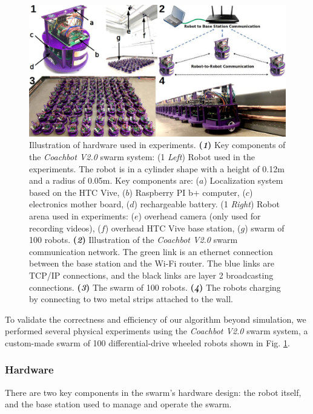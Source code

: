 \documentclass[journal]{IEEEtran}
\begin{document}
\begin{figure}[t]
\centering
\includegraphics[width=1.0\textwidth]{variance/all_v.jpg}
\caption{Illustration of hardware used in experiments. \textbf{(\textit{1})} Key components of the \textit{Coachbot V2.0} swarm system: (1 \textit{Left}) Robot used in the experiments. The robot is in a cylinder shape with a height of 0.12m and a radius of 0.05m.  Key components are: ($a$) Localization system based on the HTC Vive, ($b$) Raspberry PI b+ computer, ($c$) electronics mother board, ($d$) rechargeable battery. (1 \textit{Right}) Robot arena used in experiments: ($e$) overhead camera (only used for recording videos), ($f$) overhead HTC Vive base station, ($g$) swarm of 100 robots. \textbf{(\textit{2})} Illustration of the \textit{Coachbot V2.0} swarm communication network. The green link is an ethernet connection between the base station and the Wi-Fi router.  The blue links are TCP/IP connections, and the black links are layer 2 broadcasting connections. \textbf{(\textit{3})} The swarm of 100 robots. \textbf{(\textit{4})} The robots charging by connecting to two metal strips attached to the wall. }
\label{fig:robot}
\end{figure}



To validate the correctness and efficiency of our algorithm beyond simulation, we performed several physical experiments using the \textit{Coachbot V2.0} swarm system, a custom-made swarm of 100 differential-drive wheeled robots shown in Fig. \ref{fig:robot}.  

\subsubsection{Hardware}
\label{hardware}

There are two key components in the swarm's hardware design: the robot itself, and the base station used to manage and operate the swarm.
\end{document}
